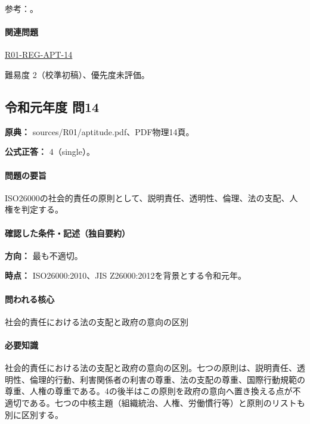 \par 参考：\cite{iso26000,iso26000_project2010}。

\paragraph{関連問題} \hyperref[q:r01-reg-apt-14]{R01-REG-APT-14}

\par 難易度 2（校準初稿）、優先度未評価。

\subsection{令和元年度 問14}
\label{q:r01-reg-apt-14}

\noindent\textbf{原典：} sources/R01/aptitude.pdf、PDF物理14頁。

\textbf{公式正答：} 4（single）。

\paragraph{問題の要旨} ISO26000の社会的責任の原則として、説明責任、透明性、倫理、法の支配、人権を判定する。

\paragraph{確認した条件・記述（独自要約）}\mbox{}\par

\noindent\textbf{方向：} 最も不適切。\par

\noindent\textbf{時点：} ISO26000:2010、JIS Z26000:2012を背景とする令和元年。\par

\paragraph{問われる核心} 社会的責任における法の支配と政府の意向の区別

\paragraph{必要知識} 社会的責任における法の支配と政府の意向の区別。七つの原則は、説明責任、透明性、倫理的行動、利害関係者の利害の尊重、法の支配の尊重、国際行動規範の尊重、人権の尊重である。4の後半はこの原則を政府の意向へ置き換える点が不適切である。七つの中核主題（組織統治、人権、労働慣行等）と原則のリストも別に区別する。

